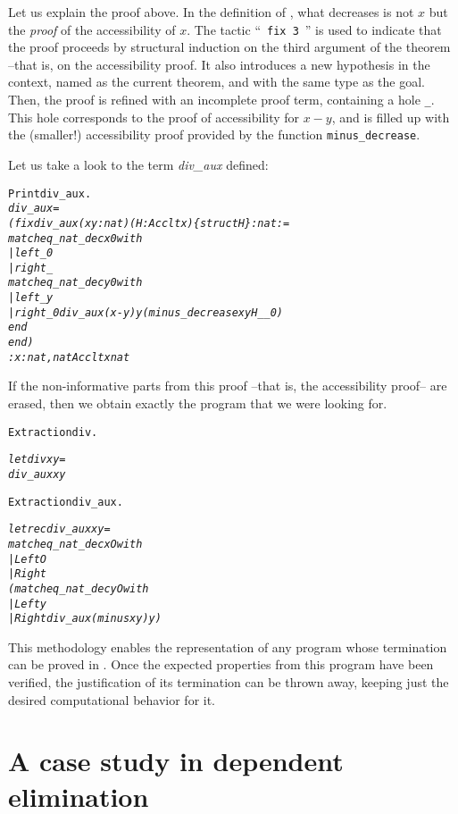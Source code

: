 \documentclass[11pt]{article}
\begin{document}
Let us explain the proof above. In the definition of ,
what decreases is not $x$ but the \textsl{proof} of the accessibility
of $x$. The tactic ``~\texttt{fix 3}~'' is used to indicate that the proof
proceeds by structural induction on the third argument of the theorem
--that is, on the accessibility proof. It also introduces a new
hypothesis in the context, named as the current theorem, and with the
same type as the goal. Then, the proof is refined with an incomplete
proof term, containing a hole \texttt{\_}.  This hole corresponds to the proof
of accessibility for $x-y$, and is filled up with the (smaller!)
accessibility proof provided by the function \texttt{minus\_decrease}. 


\noindent Let us take a look to the term \textsl{div\_aux} defined:

\pagebreak
\begin{alltt}
Print div_aux.
\it
div_aux = 
(fix div_aux (x y : nat) (H : Acc lt x) \{struct H\} : nat :=
   match eq_nat_dec x 0 with
   | left _ {\funarrow} 0
   | right _ {\funarrow}
       match eq_nat_dec y 0 with
       | left _ {\funarrow} y
       | right _0 {\funarrow} div_aux (x - y) y (minus_decrease x y H _ _0)
       end
   end)
     : {\prodsym} x : nat, nat {\arrow} Acc lt x {\arrow} nat

\end{alltt}

If the non-informative parts from this proof --that is, the
accessibility proof-- are erased, then we obtain exactly the program
that we were looking for. 
\begin{alltt}

Extraction div.

\it
let div x y =
  div_aux x y
\tt

Extraction div_aux.

\it
let rec div_aux x y =
  match eq_nat_dec x O with
    | Left {\arrow} O
    | Right {\arrow}
        (match eq_nat_dec y O with
           | Left {\arrow} y
           | Right {\arrow} div_aux (minus x y) y)
\end{alltt}

This methodology enables the representation
of any program whose termination can be proved in {\coq}. Once the
expected properties from this program have been verified, the
justification of its termination can be thrown away, keeping just the
desired computational behavior for it.

\section{A case study in dependent elimination}\label{CaseStudy}
\end{document}
